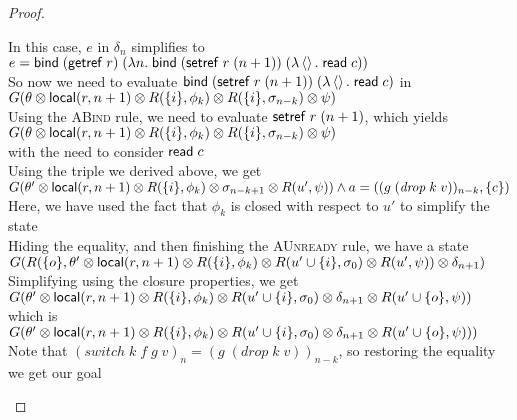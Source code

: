\begin{proof}
\begin{tabbedproof}
\ooo In this case, $e$ in $\delta_n$ simplifies to \\
\oooo $e = \mathsf{bind}\; (\mathsf{getref}\; r)\; (\lambda n.\;\mathsf{bind}\; (\mathsf{setref}\; r\;(n+1))\; (\lambda \left<\right>.\;\mathsf{read}\; c))$ \\
\ooo So now we need to evaluate $\mathsf{bind}\; (\mathsf{setref}\; r\;(n+1))\; (\lambda \left<\right>.\;\mathsf{read}\; c)$ in \\
\ooo $G(\theta \otimes \mathsf{local}({r}, {n+1}) \otimes R(\{{i}\}, \phi_k) \otimes R(\{{i}\}, \sigma_{n-k}) \otimes \psi)$ \\
\ooo Using the \textsc{ABind} rule, we need to evaluate $\mathsf{setref}\; r\;(n+1)$, which yields  \\
\ooo $G(\theta \otimes \mathsf{local}({r}, {n+1}) \otimes R(\{{i}\}, \phi_k) \otimes R(\{{i}\}, \sigma_{n-k}) \otimes \psi)$ \\
\ooo with the need to consider $\mathsf{read}\; c$ \\
\ooo Using the triple we derived above, we get \\
\ooo $G(\theta' \otimes \mathsf{local}({r}, {n+1}) \otimes R(\{{i}\}, \phi_k) \otimes \sigma_{n-k+1} \otimes R(u', \psi))
      \land a = ((g\;(\mathit{drop}\;k\;v))_{n-k}, \{{c}\})$ \\
\ooo Here, we have used the fact that $\phi_k$ is closed with respect to $u'$ to simplify the state\\
\ooo Hiding the equality, and then finishing the \textsc{AUnready} rule, we have a state \\
\ooo $G(R(\{{o}\}, \theta' \otimes \mathsf{local}({r}, {n+1}) \otimes R(\{{i}\}, \phi_k) \otimes R(u' \cup \{{i}\}, \sigma_0) \otimes R(u', \psi)) \otimes \delta_{n+1})$\\
\ooo Simplifying using the closure properties, we get \\
\ooo $G(\theta' \otimes \mathsf{local}({r}, {n+1}) \otimes R(\{{i}\}, \phi_k) \otimes R(u' \cup \{{i}\}, \sigma_0) \otimes \delta_{n+1} \otimes R(u' \cup \{{o}\}, \psi))$\\
\ooo which is \\
\ooo $G(\theta' \otimes \mathsf{local}({r}, {n+1}) \otimes R(\{{i}\}, \phi_k) \otimes R(u' \cup \{{i}\}, \sigma_0) \otimes \delta_{n+1} \otimes R(u' \cup \{{o}\}, \psi)))$\\
\ooo Note that $(\mathit{switch}\;k\;f\;g\;v)_n = (g\;(\mathit{drop}\;k\;v))_{n-k}$, so restoring the equality \\
\oox we get our goal
\end{tabbedproof}
\end{proof}


